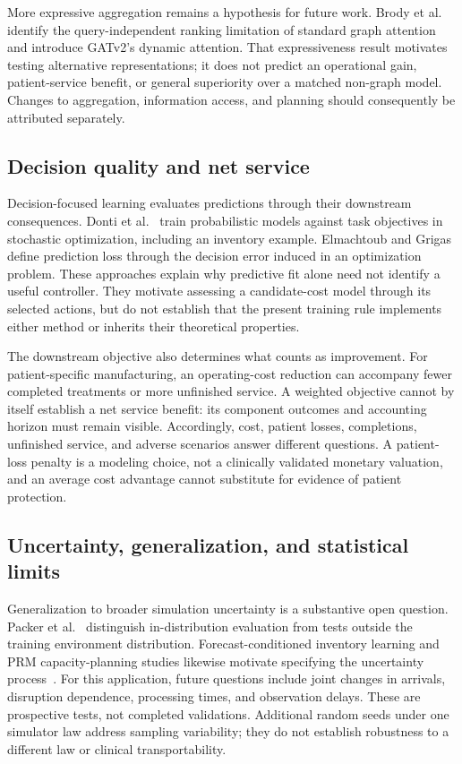 More expressive aggregation remains a hypothesis for future work. Brody et al.~\cite{Brody2022GATv2} identify the query-independent ranking limitation of standard graph attention and introduce GATv2's dynamic attention. That expressiveness result motivates testing alternative representations; it does not predict an operational gain, patient-service benefit, or general superiority over a matched non-graph model. Changes to aggregation, information access, and planning should consequently be attributed separately.

\subsection{Decision quality and net service}
Decision-focused learning evaluates predictions through their downstream consequences. Donti et al.~\cite{Donti2017TaskBased} train probabilistic models against task objectives in stochastic optimization, including an inventory example. Elmachtoub and Grigas~\cite{Elmachtoub2022SmartPredict} define prediction loss through the decision error induced in an optimization problem. These approaches explain why predictive fit alone need not identify a useful controller. They motivate assessing a candidate-cost model through its selected actions, but do not establish that the present training rule implements either method or inherits their theoretical properties.

The downstream objective also determines what counts as improvement. For patient-specific manufacturing, an operating-cost reduction can accompany fewer completed treatments or more unfinished service. A weighted objective cannot by itself establish a net service benefit: its component outcomes and accounting horizon must remain visible. Accordingly, cost, patient losses, completions, unfinished service, and adverse scenarios answer different questions. A patient-loss penalty is a modeling choice, not a clinically validated monetary valuation, and an average cost advantage cannot substitute for evidence of patient protection.

\subsection{Uncertainty, generalization, and statistical limits}
Generalization to broader simulation uncertainty is a substantive open question. Packer et al.~\cite{Packer2018Generalization} distinguish in-distribution evaluation from tests outside the training environment distribution. Forecast-conditioned inventory learning and PRM capacity-planning studies likewise motivate specifying the uncertainty process~\cite{Dehaybe2024NonstationaryInventory,Tseng2025}. For this application, future questions include joint changes in arrivals, disruption dependence, processing times, and observation delays. These are prospective tests, not completed validations. Additional random seeds under one simulator law address sampling variability; they do not establish robustness to a different law or clinical transportability.

